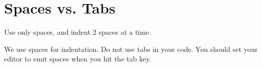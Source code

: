 
\section{Spaces vs. Tabs}\label{sec:spaces-vs.-tabs}
Use only spaces, and indent 2 spaces at a time.

We use spaces for indentation. Do not use tabs in your code. You should set your editor to emit spaces when you hit the tab key.
